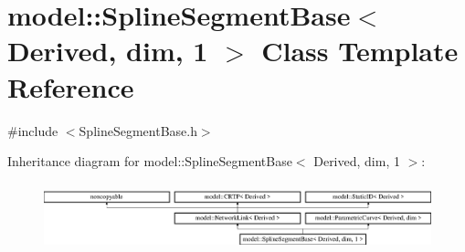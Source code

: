 \hypertarget{classmodel_1_1_spline_segment_base_3_01_derived_00_01dim_00_011_01_4}{}\section{model\+:\+:Spline\+Segment\+Base$<$ Derived, dim, 1 $>$ Class Template Reference}
\label{classmodel_1_1_spline_segment_base_3_01_derived_00_01dim_00_011_01_4}


{\ttfamily \#include $<$Spline\+Segment\+Base.\+h$>$}

Inheritance diagram for model\+:\+:Spline\+Segment\+Base$<$ Derived, dim, 1 $>$\+:\begin{figure}[H]
\begin{center}
\leavevmode
\includegraphics[height=1.978799cm]{classmodel_1_1_spline_segment_base_3_01_derived_00_01dim_00_011_01_4}
\end{center}
\end{figure}
